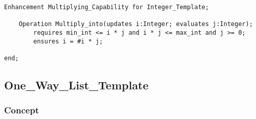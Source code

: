 \begin{lstlisting}[language=resolve]
Enhancement Multiplying_Capability for Integer_Template;

    Operation Multiply_into(updates i:Integer; evaluates j:Integer);
        requires min_int <= i * j and i * j <= max_int and j >= 0;
        ensures	i = #i * j;

end;
\end{lstlisting}

	\subsection{One\_Way\_List\_Template}	%

		\subsubsection{Concept}	%

